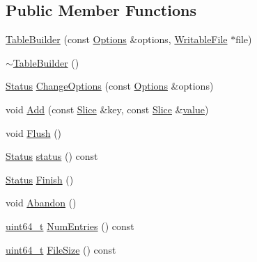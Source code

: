 \subsection*{Public Member Functions}
\begin{DoxyCompactItemize}
\item 
\hyperlink{classleveldb_1_1_table_builder_a7f5d99e06039848d9b342a4871b31cc6}{Table\-Builder} (const \hyperlink{structleveldb_1_1_options}{Options} \&options, \hyperlink{classleveldb_1_1_writable_file}{Writable\-File} $\ast$file)
\item 
\hyperlink{classleveldb_1_1_table_builder_aa166d9bae1402bf2e77f7c45469e715d}{$\sim$\-Table\-Builder} ()
\item 
\hyperlink{classleveldb_1_1_status}{Status} \hyperlink{classleveldb_1_1_table_builder_a6e37a5ddc82161e8665f2fba08031c24}{Change\-Options} (const \hyperlink{structleveldb_1_1_options}{Options} \&options)
\item 
void \hyperlink{classleveldb_1_1_table_builder_a37bd347cb6340215475ac9b42dc19d10}{Add} (const \hyperlink{classleveldb_1_1_slice}{Slice} \&key, const \hyperlink{classleveldb_1_1_slice}{Slice} \&\hyperlink{cache_8cc_a0f61d63b009d0880a89c843bd50d8d76}{value})
\item 
void \hyperlink{classleveldb_1_1_table_builder_a544560b4c97cd382ba9b8e0ef69dacfa}{Flush} ()
\item 
\hyperlink{classleveldb_1_1_status}{Status} \hyperlink{classleveldb_1_1_table_builder_aaec88faf09425e9c229a69e34656bf80}{status} () const 
\item 
\hyperlink{classleveldb_1_1_status}{Status} \hyperlink{classleveldb_1_1_table_builder_a88f4bae006782e24462362d489dd3f35}{Finish} ()
\item 
void \hyperlink{classleveldb_1_1_table_builder_a3b4dded079f960b8624bdfa13d967b94}{Abandon} ()
\item 
\hyperlink{stdint_8h_aaa5d1cd013383c889537491c3cfd9aad}{uint64\-\_\-t} \hyperlink{classleveldb_1_1_table_builder_a765e1dfcb4e12d0b56fd70e758d9a5c2}{Num\-Entries} () const 
\item 
\hyperlink{stdint_8h_aaa5d1cd013383c889537491c3cfd9aad}{uint64\-\_\-t} \hyperlink{classleveldb_1_1_table_builder_a5844a15a8f94d2c44da709937f29039c}{File\-Size} () const 
\end{DoxyCompactItemize}
